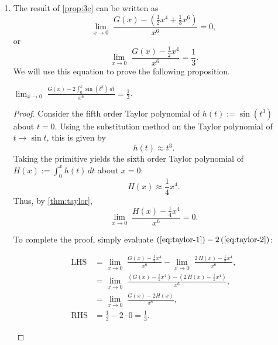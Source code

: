 \begin{enumerate}
\begin{enumerate}
            \item The result of \cref{prop:3c} can be written as
                \[ \lim_{x \to 0} \; \frac{G(x) - (\frac{1}{2} x^4 + \frac{1}{3} x^6)}{x^6} = 0, \]
                or
                \begin{equation} \label{eq:taylor-1}
                    \lim_{x \to 0} \;\frac{G(x) - \frac{1}{2} x^4}{x^6} = \frac{1}{3}.
                \end{equation}
                We will use this equation to prove the following proposition.

                \medskip

                \begin{proposition}
                    $\lim_{x \to 0} \; \frac{G(x) - 2 \int_0^x \sin(t^3) \, dt}{x^6} = \frac{1}{3}$.
                \end{proposition}

                \smallskip

                \begin{proof}
                    Consider the fifth order Taylor polynomial of $h(t) := \sin(t^3)$ about $t = 0$. Using the substitution method on the Taylor polynomial of $t \to \sin t$, this is given by
                    \[ h(t) \approx t^3. \]
                    Taking the primitive yields the sixth order Taylor polynomial of $H(x) := \int_0^x h(t) \, dt$ about $x = 0$:
                    \[ H(x) \approx \frac{1}{4} x^4. \]
                    Thus, by \cref{thm:taylor},
                    \begin{equation} \label{eq:taylor-2}
                        \lim_{x \to 0} \; \frac{H(x) - \frac{1}{4}{x^4}}{x^6} = 0.
                    \end{equation}

                    To complete the proof, simply evaluate $(\ref{eq:taylor-1}) - 2 \, (\ref{eq:taylor-2})$:
                    \begin{spreadlines}{\baselineskip}
                        \begin{align*}
                            \text{LHS} &= \lim_{x \to 0} \; \frac{G(x) - \frac{1}{2} x^4}{x^6} - \lim_{x \to 0} \; \frac{2 \, H(x) - \frac{1}{2}{x^4}}{x^6}, \\
                            &= \lim_{x \to 0} \; \frac{\left(G(x) - \frac{1}{2} x^4\right) - \left(2 \, H(x) - \frac{1}{2} x^4\right)}{x^6}, \\
                            &= \lim_{x \to 0} \; \frac{G(x) - 2 H(x)}{x^6}, \\
                            \text{RHS} &= \frac{1}{3} - 2 \cdot 0 = \frac{1}{3}.
                        \end{align*}
                    \end{spreadlines}


\end{proof}
\end{enumerate}
\end{enumerate}
